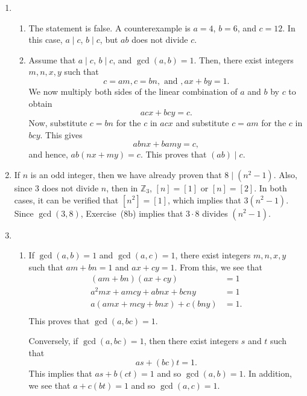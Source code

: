 \begin{enumerate}
\item \begin{enumerate}
\item The statement is false.  A counterexample is $a = 4$, $b = 6$, and $c = 12$.  In this case, 
$a \mid c$, $b \mid c$, but $ab$ does not divide $c$.

\item Assume that $a \mid c$, $b \mid c$, and $\gcd \left( a, b \right) = 1$.  Then, there exist integers $m, n, x, y$ such that
\[
c = am, c = bn, \text{ and }, ax + by = 1.
\]
We now multiply both sides of the linear combination of $a$ and $b$ by $c$ to obtain
\[
acx + bcy = c.
\]
Now, substitute $c = bn$ for the $c$ in $acx$ and substitute $c = am$ for the $c$ in $bcy$.  This gives
\[
abnx + bamy = c,
\]
and hence, $ab \left( nx + my \right) = c$.  This proves that $\left( ab \right) \mid c$.
\end{enumerate}

\item If $n$ is an odd integer, then we have already proven that $8 \mid \left( n^2 - 1 \right)$.  Also, since 3 does not divide $n$, then in $\mathbb{Z}_3$, $\left[ n \right] = \left[ 1 \right]$ or $\left[ n \right] = \left[ 2 \right]$.  In both cases, it can be verified that 
$\left[ n^2 \right] = \left[ 1 \right]$, which implies that $3 \left( n^2 -1 \right)$.  Since 
$\gcd \left( 3, 8 \right)$, Exercise~(8b) implies that $3 \cdot 8$ divides 
$\left( n^2 - 1 \right)$.

\item \begin{enumerate}
\item If $\gcd \left( {a, b} \right) = 1$ and  $\gcd \left( {a, c} \right) = 1$, there exist integers $m, n, x, y$ such that $am + bn = 1$ and $ax + cy = 1$.  From this, we see that
\[
\begin{aligned}
          \left( am + bn \right) \left( ax + cy \right) &= 1 \\
                              a^2 mx +amcy +abnx + bcny &= 1 \\
a \left( amx + mcy + bnx \right) + c \left( bny \right) &=1. \\
\end{aligned}
\]
This proves that $\gcd \left( a, bc \right) = 1$.

\newpar
Conversely, if $\gcd \left( a, bc \right) = 1$, then there exist integers $s$ and $t$ such that
\[
as + (bc)t = 1.
\]
This implies that $as + b(ct) = 1$ and so $\gcd (a, b) = 1$.  In addition, we see that $a + c(bt) = 1$ and so 
$\gcd (a, c) = 1$.


\end{enumerate}
\end{enumerate}
